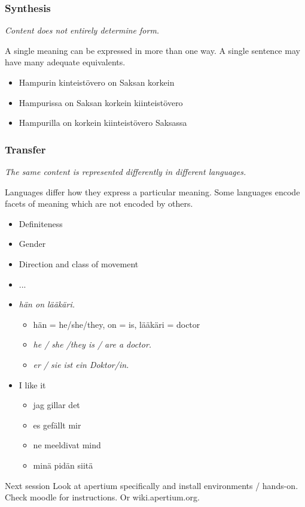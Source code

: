\documentclass{beamer}
\begin{document}
\begin{frame}
  \frametitle{Synthesis}

\begin{center}
{\em Content does not entirely determine form.}
\end{center}

A single meaning can be expressed in more than one way. A
single sentence may have many adequate equivalents.

\begin{itemize}
\item Hampurin kinteistövero on Saksan korkein
\item Hampurissa on Saksan korkein kiinteistövero
\item Hampurilla on korkein kiinteistövero Saksassa
\end{itemize}

\end{frame}
\begin{frame}
  \frametitle{Transfer}

\begin{center}
{\em The same content is represented differently in different languages.}

\end{center}

Languages differ how they express a particular meaning. Some
languages encode facets of meaning which are not encoded by
others.

\begin{itemize}
  \item Definiteness
  \item Gender
  \item Direction and class of movement
  \item ...
\end{itemize}

\begin{itemize}
\item {\em hän on lääkäri.}
\begin{itemize}
  \item hän = he/she/they, on = is, lääkäri = doctor
\item {\em he / she /they  is / are a doctor.}
\item {\em er / sie ist ein Doktor/in.}
\end{itemize}
\end{itemize}
\begin{itemize}
\item I like it
    \begin{itemize}
        \item jag gillar det
        \item es gefällt mir
        \item ne meeldivat mind
        \item minä pidän siitä
    \end{itemize}
\end{itemize}


\end{frame}

\begin{frame}{Next session}
Look at apertium specifically and install environments / hands-on.
Check moodle for instructions. Or wiki.apertium.org.
\end{frame}
\end{document}
